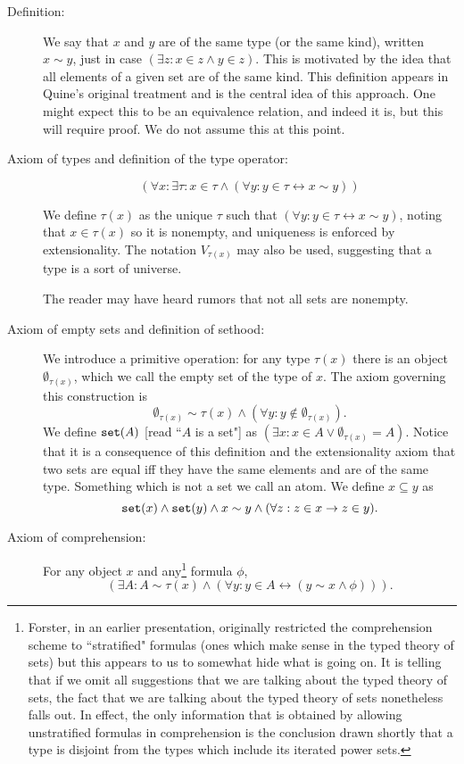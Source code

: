 \documentclass[12pt]{article}
\begin{document}
\begin{description}

\item[Definition:]  We say that $x$ and $y$ are of the same type (or the same kind), written $x \sim y$, just in case $(\exists z:x \in z \wedge y \in z)$.  This is motivated by the idea that all elements of a given set are of the same kind.  This definition appears in Quine's original treatment and is the central idea of this approach.  One might expect this to be an equivalence relation, and indeed it is, but this will require proof.  We do not assume this at this point.

\item[Axiom of types and definition of the type operator:]  $$(\forall x:\exists \tau:x \in \tau \wedge (\forall y:y \in \tau \leftrightarrow x \sim y))$$

We define $\tau(x)$ as the unique $\tau$ such that $(\forall y:y \in \tau \leftrightarrow x \sim y)$, noting that
$x \in \tau(x)$ so it is nonempty, and uniqueness is enforced by extensionality.  The notation $V_{\tau(x)}$ may also be used, suggesting that a type is a sort of universe.

The reader may have heard rumors that not all sets are nonempty.

\item[Axiom of empty sets and definition of sethood:]  We introduce a primitive operation:  for any type $\tau(x)$ there is an object $\emptyset_{\tau(x)}$, which we call the empty set of the type of $x$.   The axiom governing this construction is
$$\emptyset_{\tau(x)} \sim \tau(x) \wedge (\forall y:y \not\in \emptyset_{\tau(x)}).$$  We define ${\tt set}(A)$ [read ``$A$ is a set"] as $(\exists x:x \in A \vee \emptyset_{\tau(x)} = A)$.  Notice that it is a consequence of this definition and the extensionality axiom that two sets are equal iff they have the same elements and are of the same type.  Something which is not a set we call an atom.  We define $x \subseteq y$ as $${\tt set}(x) \wedge {\tt set}(y) \wedge x \sim y \wedge (\forall z:z \in x \rightarrow z \in y).$$


\item[Axiom of comprehension:]  For any object $x$ and any\footnote{Forster, in an earlier presentation,  originally restricted the comprehension scheme to ``stratified" formulas (ones which make sense in the typed theory of sets) but this appears to us to somewhat hide what is going on.  It is telling that if we omit all suggestions that we are talking about the typed theory of sets,
the fact that we are talking about the typed theory of sets nonetheless falls out.  In effect, the only information that is obtained by allowing unstratified formulas in comprehension is the conclusion drawn shortly that a type is disjoint from the types which include its iterated power sets.} formula $\phi$, $$(\exists A:A \sim \tau(x) \wedge (\forall y:y \in A \leftrightarrow (y \sim x \wedge \phi))).$$


\end{description}
\end{document}
